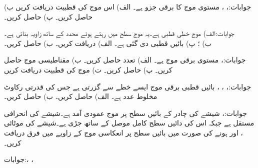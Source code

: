 جوابات:، ، 
مستوی موج کا برقی جزو  ہے۔ الف) اس موج کی قطبیت دریافت کریں ب)  حاصل کریں۔ پ)  حاصل کریں۔

جوابات:الف) موج خطی قطبی ہے۔یہ موج  سطح میں رہتے ہوئے  محدد کے ساتھ  زاویہ بناتی ہے۔\\
 ب) ؛ پ) 
بائیں قطبی  دی گئی ہے۔ الف)  دریافت کریں۔ ب)  حاصل کریں۔

جوابات:، 
مستوی برقی موج  ہے۔ الف) تعدد حاصل کریں۔ ب) مقناطیسی موج حاصل کریں۔ پ)  حاصل کریں۔ ت) موج کی قطبیت دریافت کریں

جوابات:، ، ، بائیں قطبی
برقی موج  ایسے خطے سے گزرتی ہے جس کی قدرتی رکاوٹ  مخلوط عدد ہے۔ الف)  حاصل کریں۔ ب)  حاصل کریں۔

جوابات:،
شیشے کی چادر کے بائیں سطح پر موج عمودی آمد ہے۔شیشے کی انحرافی مستقل  ہے جبکہ اس کی دائیں سطح کامل موصل کے ساتھ جڑی ہے۔شیشے کی موٹائی ،  اور  ہونے کی صورت میں بائیں سطح پر انعکاسی موج کے زاویے میں فرق دریافت کریں۔

جوابات:، ، 

